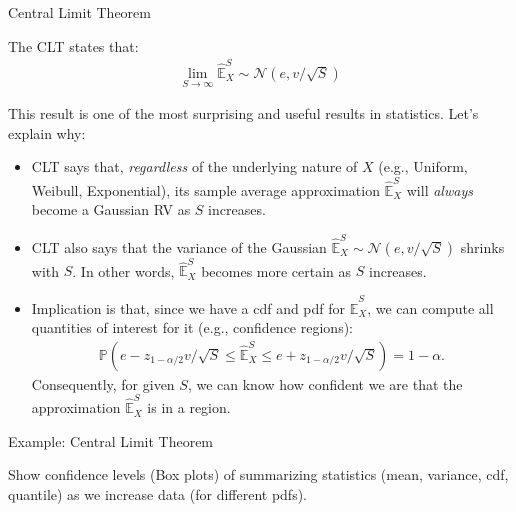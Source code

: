 \documentclass[9pt]{beamer}
\begin{document}
%
\begin{frame}{Central Limit Theorem}

\begin{block}{}
The CLT states that:
\begin{align*}
\lim_{S\to \infty}\hat{\mathbb{E}}_X^S\sim \mathcal{N}(e,v/\sqrt{S})
\end{align*}
\end{block}

This result is one of the most surprising and useful results in statistics. Let's explain why:

\begin{itemize}

\item CLT says that, {\em regardless} of the underlying nature of $X$ (e.g., Uniform, Weibull, Exponential), its sample average approximation $\hat{\mathbb{E}}_X^S$ will {\em always} become a Gaussian RV as $S$ increases.  

\item CLT also says that the variance of the Gaussian $\hat{\mathbb{E}}_X^S\sim \mathcal{N}(e,v/\sqrt{S})$ shrinks with $S$. In other words, $\hat{\mathbb{E}}_X^S$ becomes more certain as $S$ increases.

\item Implication is that, since we have a cdf and pdf for $\hat{\mathbb{E}}_X^S$, we can compute all quantities of interest for it (e.g., confidence regions):
\begin{align*}
\mathbb{P}\left(e-z_{1-\alpha/2}v/\sqrt{S}\leq \hat{\mathbb{E}}_X^S\leq e+z_{1-\alpha/2}v/\sqrt{S}\right)=1-\alpha.
\end{align*}
Consequently, for given $S$, we can know how confident we are that the approximation $\hat{\mathbb{E}}_X^S$ is in a region.  

\end{itemize}


\end{frame}

%
\begin{frame}{Example: Central Limit Theorem}

\begin{block}{}
{\color{red} Show confidence levels (Box plots) of summarizing statistics (mean, variance, cdf, quantile) as we increase data (for different pdfs).}
\end{block}

\end{frame}
\end{document}
